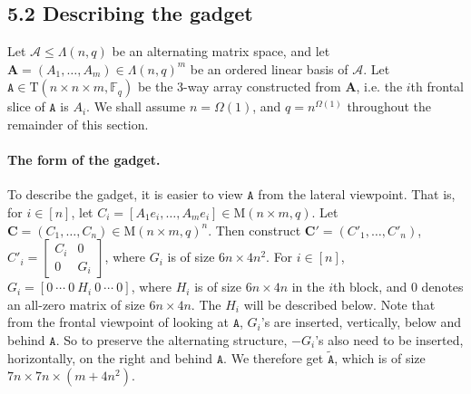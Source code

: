 \subsection*{5.2 Describing the gadget}
Let $\mathcal A\le\Lambda(n,q)$ be an alternating matrix space, and let $\mathbf A=(A_1,\ldots,A_m)\in\Lambda(n,q)^m$ be an ordered linear basis of $\mathcal A$. Let $\mathtt A\in\mathrm T(n\times n\times m,\mathbb F_q)$ be the 3-way array constructed from $\mathbf A$, i.e. the $i$th frontal slice of $\mathtt A$ is $A_i$.
We shall assume $n=\Omega(1)$, and $q=n^{\Omega(1)}$ throughout the remainder of this section.
\paragraph{The form of the gadget.} To describe the gadget, it is easier to view $\mathtt A$ from the lateral viewpoint. That is, for $i\in[n]$, let $C_i=[A_1e_i,\ldots,A_me_i]\in\mathrm M(n\times m,q)$. Let $\mathbf C=(C_1,\ldots,C_n)\in\mathrm M(n\times m,q)^n$. Then construct $\mathbf C'=(C'_1,\ldots,C'_n)$, $C'_i=\begin{bmatrix}C_i&0\\0&G_i\end{bmatrix}$, where $G_i$ is of size $6n\times4n^2$. For $i\in[n]$, $G_i=[0\ \cdots\ 0\ H_i\ 0\ \cdots\ 0]$, where $H_i$ is of size $6n\times4n$ in the $i$th block, and 0 denotes an all-zero matrix of size $6n\times4n$. The $H_i$ will be described below.
Note that from the frontal viewpoint of looking at $\mathtt A$, $G_i$'s are inserted, vertically, below and behind $\mathtt A$. So to preserve the alternating structure, $-G_i$'s also need to be inserted, horizontally, on the right and behind $\mathtt A$. We therefore get $\widetilde{\mathtt A}$, which is of size $7n\times7n\times(m+4n^2)$.
